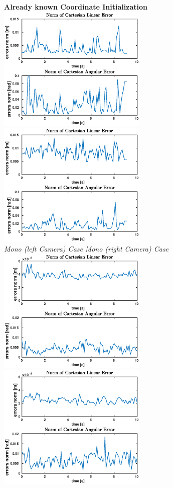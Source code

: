 \begin{figure}
	\centering
	\textbf{Already known Coordinate Initialization}\\
	\vspace*{20px}
	\includegraphics[width=7.15cm]{tracking/click-mono-left.eps}
	\includegraphics[width=7.15cm]{tracking/click-mono-right.eps}\\
	\hspace*{15px}\textit{Mono (left Camera) Case} \hspace{55px} \textit{Mono (right Camera) Case}\\
	\vspace{30px}
	\includegraphics[width=7.15cm]{tracking/click-stereo.eps}
	\includegraphics[width=7.15cm]{tracking/click-depth.eps}\\

\end{figure}
